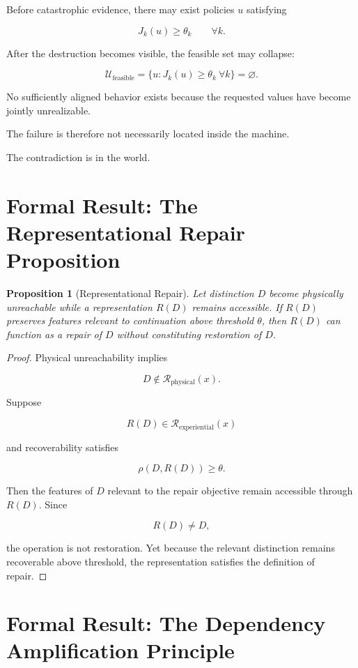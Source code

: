 \documentclass[11pt,oneside]{book}
\newtheorem{proposition}[theorem]{Proposition}
\theoremstyle{definition}
\theoremstyle{remark}
\newcommand{\R}{\mathcal{R}}
\begin{document}
Before catastrophic evidence, there may exist policies \(u\) satisfying

\[
J_k(u)\geq\theta_k
\qquad
\forall k.
\]

After the destruction becomes visible, the feasible set may collapse:

\[
\mathcal U_{\mathrm{feasible}}
=
\{
u:
J_k(u)\geq\theta_k
\ \forall k
\}
=
\varnothing.
\]

No sufficiently aligned behavior exists because the requested values have become jointly unrealizable.

The failure is therefore not necessarily located inside the machine.

The contradiction is in the world.

\section{Formal Result: The Representational Repair Proposition}

\begin{proposition}[Representational Repair]
Let distinction \(D\) become physically unreachable while a representation \(R(D)\) remains accessible. If \(R(D)\) preserves features relevant to continuation above threshold \(\theta\), then \(R(D)\) can function as a repair of \(D\) without constituting restoration of \(D\).
\end{proposition}

\begin{proof}
Physical unreachability implies

\[
D\notin\R_{\mathrm{physical}}(x).
\]

Suppose

\[
R(D)\in\R_{\mathrm{experiential}}(x)
\]

and recoverability satisfies

\[
\rho(D,R(D))\geq\theta.
\]

Then the features of \(D\) relevant to the repair objective remain accessible through \(R(D)\). Since

\[
R(D)\neq D,
\]

the operation is not restoration. Yet because the relevant distinction remains recoverable above threshold, the representation satisfies the definition of repair.
\end{proof}

\section{Formal Result: The Dependency Amplification Principle}
\end{document}
